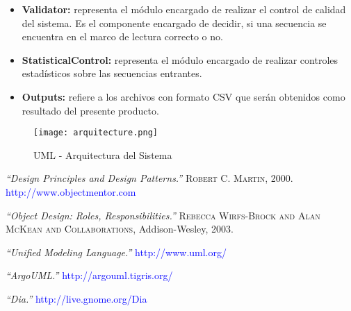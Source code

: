 \documentclass[12pt,a4paper,spanish]{article}
\begin{document}
\begin{itemize}
  \item \textbf{Validator:} representa el módulo encargado de realizar el control de calidad del sistema. Es el componente 	 encargado de decidir, si una secuencia se encuentra en el marco de lectura correcto o no.

  \item \textbf{StatisticalControl:} representa el módulo encargado de realizar controles estadísticos sobre las 	 
  secuencias entrantes.

  \item \textbf{Outputs:} refiere a los archivos con formato \textsf{CSV} que serán obtenidos como resultado del presente
  producto.
 
\end{itemize}

\begin{figure}[!hbtp]
	\begin{center}
		\texttt{[image: arquitecture.png]}
		\caption{UML - Arquitectura del Sistema}
		\label{arquitecture}
	\end{center}
\end{figure}







\begin{thebibliography}{99}
\small  {} {\em{“Design Principles and Design Patterns.”}} 
		\textsc{Robert C. Martin}, 2000. \textcolor{blue}{http://www.objectmentor.com}
  
\small  {} {\em{“Object Design: Roles, Responsibilities.”}} 
		\textsc{Rebecca Wirfs-Brock and Alan McKean and Collaborations}, Addison-Wesley, 2003.  

\small  {} {\em{“Unified Modeling Language.”}} \textcolor{blue}{http://www.uml.org/}

\small  {} {\em{“ArgoUML.”}} \textcolor{blue}{http://argouml.tigris.org/}

\small {} {\em{“Dia.”}} \textcolor{blue}{http://live.gnome.org/Dia}
\end{thebibliography}
\end{document}
